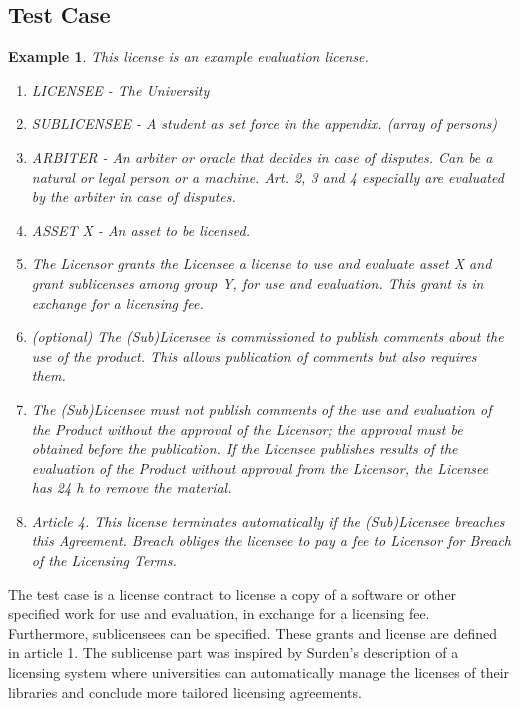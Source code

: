 \documentclass{article}
\newtheorem{example}{Example}
\begin{document}
\subsection{Test Case}
%
\begin{example}\label{ex:license_example}
This license is an example evaluation license.

\begin{enumerate}[label={Article \arabic*.},leftmargin=*]

\item[] LICENSEE - The University
\item[] SUBLICENSEE - A student as set force in the appendix. (array of persons)
\item[] ARBITER - An arbiter or oracle that decides in case of disputes. Can be a natural or legal person or a machine. Art. 2, 3 and 4 especially are evaluated by the arbiter in case of disputes.
\item[] ASSET X - An asset to be licensed.
\item The Licensor grants the Licensee a license to use and evaluate asset X and grant sublicenses among group Y, for use and evaluation. This grant is in exchange for a licensing fee.
\item (optional) The (Sub)Licensee is commissioned to publish comments about the use of the product. This allows publication of comments but also requires them.
\item The (Sub)Licensee must not publish comments of the use and evaluation  of the Product without the approval of the Licensor; the approval must be obtained before the publication. If the Licensee publishes results of the evaluation of the Product without approval from the Licensor, the Licensee has 24 h to remove the material.
\item Article 4.  This license terminates automatically if the (Sub)Licensee breaches this Agreement. Breach obliges the licensee to pay a fee to Licensor for Breach of the Licensing Terms.
\end{enumerate}
\end{example}
The test case is a license contract to license a copy of a software or other specified work for use and evaluation, in exchange for a licensing fee. Furthermore, sublicensees can be specified. These grants and license are defined in article 1. The sublicense part was inspired by Surden’s  description of a licensing system where universities can automatically manage the licenses of their libraries and conclude more tailored licensing agreements. %
\end{document}
